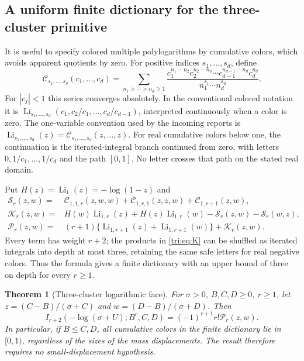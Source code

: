 \documentclass[11pt,a4paper]{article}
\newtheorem{theorem}{Theorem}[section]
\theoremstyle{definition}
\theoremstyle{remark}
\numberwithin{equation}{section}
\begin{document}
\subsection{A uniform finite dictionary for the three-cluster primitive}

It is useful to specify colored multiple polylogarithms by cumulative
colors, which avoids apparent quotients by zero. For positive
indices $s_1,\ldots,s_d$, define
\begin{equation}\label{tri:eq:cumulative}
 \mathcal C_{s_1,\ldots,s_d}(c_1,\ldots,c_d)
 =\sum_{n_1>\cdots>n_d\ge1}
 \frac{c_1^{n_1-n_2}c_2^{n_2-n_3}\cdots
            c_{d-1}^{n_{d-1}-n_d}c_d^{n_d}}
      {n_1^{s_1}\cdots n_d^{s_d}}.
\end{equation}
For $|c_j|<1$ this series converges absolutely. In the conventional
colored notation it is
$\operatorname{Li}_{s_1,\ldots,s_d}
(c_1,c_2/c_1,\ldots,c_d/c_{d-1})$, interpreted continuously
when a color is zero. The one-variable convention used by the
incoming reports is
$\operatorname{Li}_{s_1,\ldots,s_d}(z)=
\mathcal C_{s_1,\ldots,s_d}(z,\ldots,z)$.
For real cumulative colors below one, the continuation is the
iterated-integral branch continued from zero, with letters
$0,1/c_1,\ldots,1/c_d$ and the path $[0,1]$. No letter crosses
that path on the stated real domain.

Put $H(z)=\operatorname{Li}_1(z)=-\log(1-z)$ and
\begin{align}
 \mathcal S_r(z,w)
   ={}&\mathcal C_{1,1,r}(z,w,w)
      +\mathcal C_{1,r,1}(z,z,w)
      +\mathcal C_{1,r+1}(z,w),\label{tri:eq:S}\\
 \mathcal K_r(z,w)
   ={}&H(w)\operatorname{Li}_{1,r}(z)
       +H(z)\operatorname{Li}_{1,r}(w)
       -\mathcal S_r(z,w)-\mathcal S_r(w,z),\label{tri:eq:K}\\
 \mathcal P_r(z,w)
   ={}&(r+1)\{\operatorname{Li}_{1,r+1}(z)
                    +\operatorname{Li}_{1,r+1}(w)\}
       +\mathcal K_r(z,w).\label{tri:eq:P}
\end{align}
Every term has weight $r+2$; the products in \eqref{tri:eq:K}
can be shuffled as iterated integrals into depth at most three,
retaining the same safe letters for real negative colors.
Thus the formula gives
a finite dictionary with an upper bound of three on depth for
every $r\ge1$.

\begin{theorem}[Three-cluster logarithmic face]
\label{tri:thm:three}
For $\sigma>0$, $B,C,D\ge0$, $r\ge1$, let
$z=(C-B)/(\sigma+C)$ and $w=(D-B)/(\sigma+D)$. Then
\begin{equation}\label{tri:eq:three}
 \boxed{\displaystyle
 I_{r+2}(-\log(\sigma+U);B^r,C,D)
       =(-1)^{r+1}r!\mathcal P_r(z,w).}
\end{equation}
In particular, if $B\le C,D$, all cumulative colors in the finite
dictionary lie in $[0,1)$, regardless of the sizes of the mass
displacements. The result therefore requires no small-displacement
hypothesis.
\end{theorem}
\end{document}
